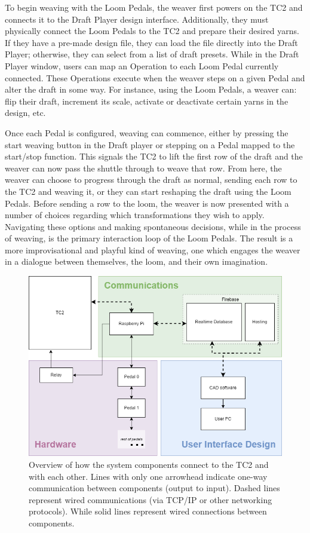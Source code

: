 To begin weaving with the Loom Pedals, the weaver first powers on the TC2 and connects it to the Draft Player design interface. Additionally, they must physically connect the Loom Pedals to the TC2 and prepare their desired yarns. If they have a pre-made design file, they can load the file directly into the Draft Player; otherwise, they can select from a list of draft presets. While in the Draft Player window, users can map an Operation to each Loom Pedal currently connected. These Operations execute when the weaver steps on a given Pedal and alter the draft in some way. For instance, using the Loom Pedals, a weaver can: flip their draft, increment its scale, activate or deactivate certain yarns in the design, etc. 

Once each Pedal is configured, weaving can commence, either by pressing the start weaving button in the Draft player or stepping on a Pedal mapped to the start/stop function. This signals the TC2 to lift the first row of the draft and the weaver can now pass the shuttle through to weave that row. From here, the weaver can choose to progress through the draft as normal, sending each row to the TC2 and weaving it, or they can start reshaping the draft using the Loom Pedals. Before sending a row to the loom, the weaver is now presented with a number of choices regarding which transformations they wish to apply. Navigating these options and making spontaneous decisions, while in the process of weaving, is the primary interaction loop of the Loom Pedals. The result is a more improvisational and playful kind of weaving, one which engages the weaver in a dialogue between themselves, the loom, and their own imagination.

\begin{figure}
    \centering
    \includegraphics[width=0.8\linewidth]{figs/LP_5_sysConnections.png}
    \caption[Overview of Loom Pedals system components.]{Overview of how the system components connect to the TC2 and with each other. Lines with only one arrowhead indicate one-way communication between components (output to input). Dashed lines represent wired communications (via TCP/IP or other networking protocols). While solid lines represent wired connections between components.}
    \label{fig:sys-connections}
\end{figure}

